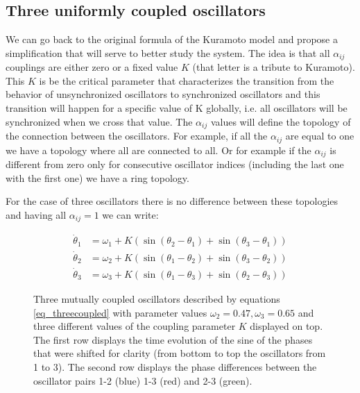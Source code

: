 \documentclass{article}
\begin{document}
\subsection{Three uniformly coupled oscillators}

We can go back to the original formula of the Kuramoto model and propose a simplification that will serve to better study the system. 
The idea is that all $\alpha_{ij}$ couplings are either zero or a fixed value $K$ (that letter is a tribute to Kuramoto). 
This $K$ is be the critical parameter that characterizes the transition from the behavior of unsynchronized oscillators to synchronized oscillators and this transition will happen for a specific value of K globally, i.e. all oscillators will be synchronized when we cross that value. 
The $\alpha_{ij}$ values will define the topology of the connection between the oscillators. 
For example, if all the $\alpha_{ij}$ are equal to one we have a topology where all are connected to all. 
Or for example if the $\alpha_{ij}$ is different from zero only for consecutive oscillator indices (including the last one with the first one) we have a ring topology.


For the case of three oscillators there is no difference between these topologies and having all $\alpha_{ij}=1$ we can write:

\begin{subequations} \label{eq_threecoupled}
\begin{align}
    \dot{\theta}_1 &= \omega_1 + K \left(\sin(\theta_2 - \theta_1)+\sin(\theta_3 - \theta_1)\right) \\
    \dot{\theta}_2 &= \omega_2 + K \left(\sin(\theta_1 - \theta_2)+\sin(\theta_3 - \theta_2)\right) \\
    \dot{\theta}_3 &= \omega_3 + K \left(\sin(\theta_1 - \theta_3)+\sin(\theta_2 - \theta_3)\right) 
\end{align}
\end{subequations}




\begin{figure} [h]
    \centerline{}
    \caption{Three mutually coupled oscillators described by equations \ref{eq_threecoupled} with parameter values $\omega_2=0.47,\omega_3=0.65$ and three different values of the coupling parameter $K$ displayed on top. The first row displays the time evolution of the sine of the phases that were shifted for clarity (from bottom to top the oscillators from 1 to 3). The second row displays the phase differences between the oscillator pairs 1-2 (blue) 1-3 (red) and 2-3 (green).}
    \label{fig_threecoupled}
\end{figure}
\end{document}
